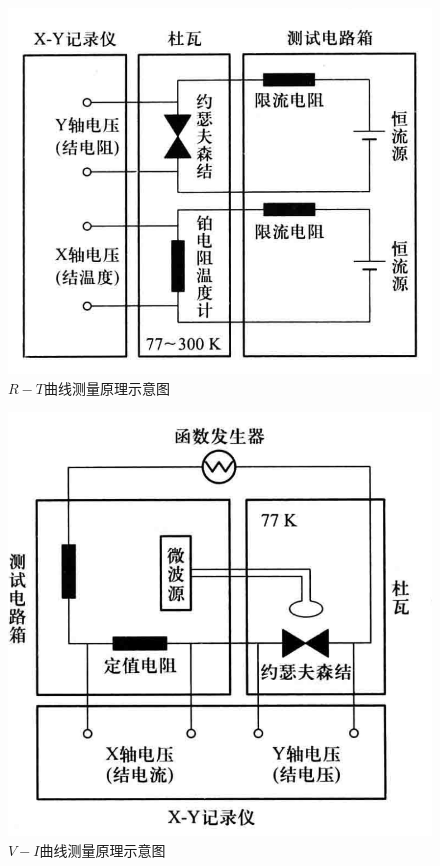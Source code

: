 \documentclass[font=default]{mpltx}
\newcommand{\note}[1]{{\color{gray}#1}}
\newcommand*\cs[1]{\texttt{\textbackslash #1}}
\begin{document}
  \begin{figure}[htbp]
  \centering
  \includegraphics[width=0.85\linewidth]{fig/RTconnect.png}
  \caption{$R-T$曲线测量原理示意图
    }
  \label{fig:RTconnect}
  \end{figure}

  \begin{figure}[htbp]
  \centering
  \includegraphics[width=0.85\linewidth]{fig/VIconnect.png}
  \caption{$V-I$曲线测量原理示意图
    }
  \label{fig:VIconnect}
  \end{figure}
\end{document}
